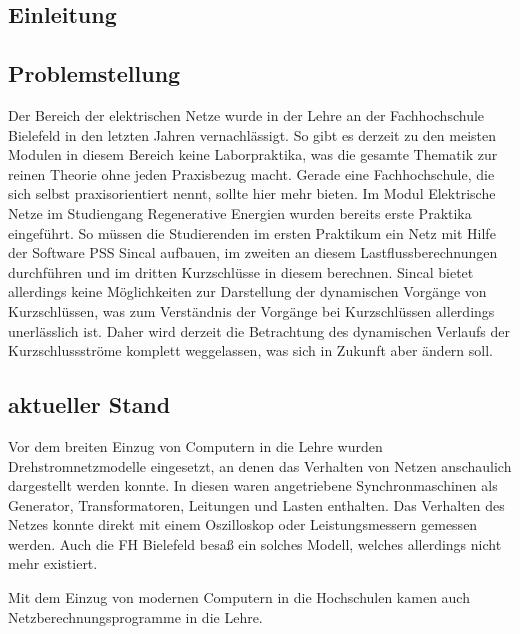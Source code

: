 \documentclass{scrartcl}
\begin{document}
	\newpage
	\setcounter{page}{1}
\begin{onehalfspace}

\section{Einleitung}
\subsection{Problemstellung}
Der Bereich der elektrischen Netze wurde in der Lehre an der Fachhochschule Bielefeld in den letzten Jahren vernachlässigt. So gibt es derzeit zu den meisten Modulen in diesem Bereich keine Laborpraktika, was die gesamte Thematik zur reinen Theorie ohne jeden Praxisbezug macht. Gerade eine Fachhochschule, die sich selbst praxisorientiert nennt, sollte hier mehr bieten. Im Modul \glqq Elektrische Netze\grqq{} im Studiengang Regenerative Energien wurden bereits erste Praktika eingeführt. So müssen die Studierenden im ersten Praktikum ein Netz mit Hilfe der Software PSS Sincal aufbauen, im zweiten an diesem Lastflussberechnungen durchführen und im dritten Kurzschlüsse in diesem berechnen. Sincal bietet allerdings keine Möglichkeiten zur Darstellung der dynamischen Vorgänge von Kurzschlüssen, was zum Verständnis der Vorgänge bei Kurzschlüssen allerdings unerlässlich ist. Daher wird derzeit die Betrachtung des dynamischen Verlaufs der Kurzschlussströme komplett weggelassen, was sich in Zukunft aber ändern soll.

\subsection{aktueller Stand}
Vor dem breiten Einzug von Computern in die Lehre wurden Drehstromnetzmodelle eingesetzt, an denen das Verhalten von Netzen anschaulich dargestellt werden konnte. In diesen waren angetriebene Synchronmaschinen als Generator, Transformatoren, Leitungen und Lasten enthalten. Das Verhalten des Netzes konnte direkt mit einem Oszilloskop oder Leistungsmessern gemessen werden. Auch die FH Bielefeld besaß ein solches Modell, welches allerdings nicht mehr existiert.

Mit dem Einzug von modernen Computern in die Hochschulen kamen auch Netzberechnungsprogramme in die Lehre.


\end{onehalfspace}
\end{document}
